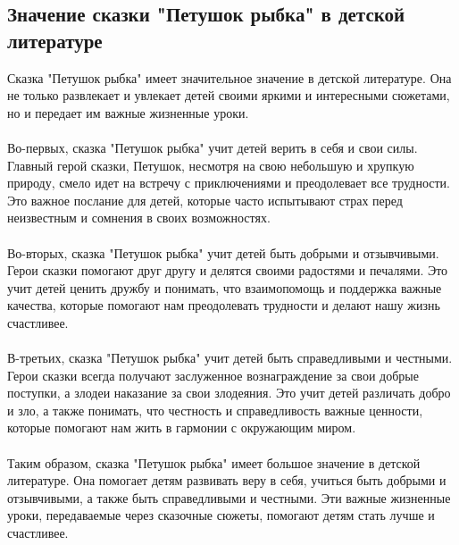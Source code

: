 \documentclass{article}
\begin{document}
\subsection{Значение сказки "{}{}Петушок рыбка"{}{} в детской литературе}
Сказка "{}{}Петушок рыбка"{}{} имеет значительное значение в детской литературе. Она не только развлекает и увлекает детей своими яркими и интересными сюжетами, но и передает им важные жизненные уроки.\\
~\\
Во-первых, сказка "{}{}Петушок рыбка"{}{} учит детей верить в себя и свои силы. Главный герой сказки, Петушок, несмотря на свою небольшую и хрупкую природу, смело идет на встречу с приключениями и преодолевает все трудности. Это важное послание для детей, которые часто испытывают страх перед неизвестным и сомнения в своих возможностях.\\
~\\
Во-вторых, сказка "{}{}Петушок рыбка"{}{} учит детей быть добрыми и отзывчивыми. Герои сказки помогают друг другу и делятся своими радостями и печалями. Это учит детей ценить дружбу и понимать, что взаимопомощь и поддержка  важные качества, которые помогают нам преодолевать трудности и делают нашу жизнь счастливее.\\
~\\
В-третьих, сказка "{}{}Петушок рыбка"{}{} учит детей быть справедливыми и честными. Герои сказки всегда получают заслуженное вознаграждение за свои добрые поступки, а злодеи  наказание за свои злодеяния. Это учит детей различать добро и зло, а также понимать, что честность и справедливость  важные ценности, которые помогают нам жить в гармонии с окружающим миром.\\
~\\
Таким образом, сказка "{}{}Петушок рыбка"{}{} имеет большое значение в детской литературе. Она помогает детям развивать веру в себя, учиться быть добрыми и отзывчивыми, а также быть справедливыми и честными. Эти важные жизненные уроки, передаваемые через сказочные сюжеты, помогают детям стать лучше и счастливее.\\
~\\

\newpage
\end{document}
